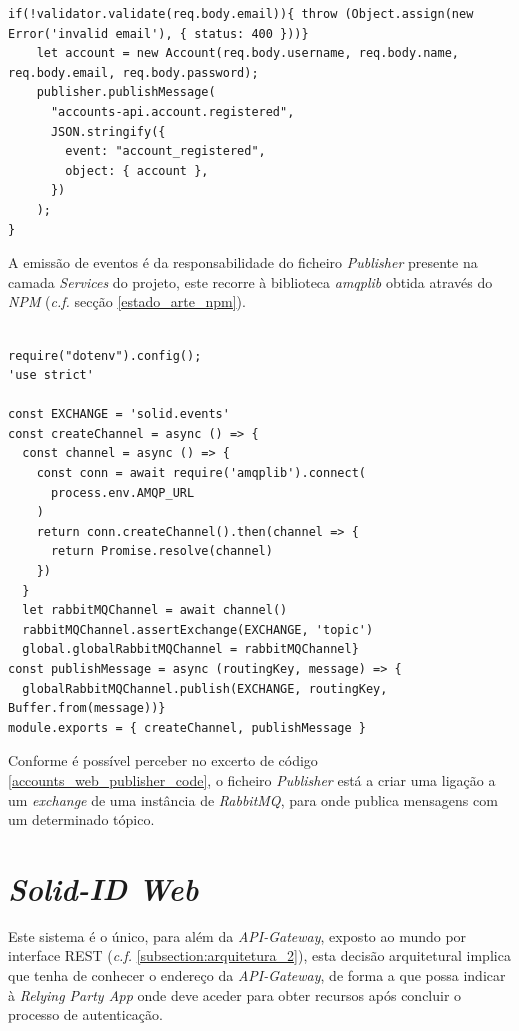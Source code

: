 \begin{lstlisting}[caption={\emph{AccountController} responsável por validar e propagar informação do utilizador}, label={accounts_web_account_controller}]
if(!validator.validate(req.body.email)){ throw (Object.assign(new Error('invalid email'), { status: 400 }))}
    let account = new Account(req.body.username, req.body.name, req.body.email, req.body.password);
    publisher.publishMessage(
      "accounts-api.account.registered",
      JSON.stringify({
        event: "account_registered",
        object: { account },
      })
    );
}
\end{lstlisting}

A emissão de eventos é da responsabilidade do ficheiro \emph{Publisher} presente na camada \emph{Services} do projeto, este recorre à biblioteca \emph{amqplib} obtida através do \emph{NPM} (\emph{c.f.} secção \ref{estado_arte_npm}).

\begin{lstlisting}[caption={\emph{Publisher} responsável por emitir os eventos para o \emph{RabbitMQ}}, label={accounts_web_publisher_code}]

require("dotenv").config();
'use strict'

const EXCHANGE = 'solid.events'
const createChannel = async () => {
  const channel = async () => {
    const conn = await require('amqplib').connect(
      process.env.AMQP_URL
    )
    return conn.createChannel().then(channel => {
      return Promise.resolve(channel)
    })
  }
  let rabbitMQChannel = await channel()
  rabbitMQChannel.assertExchange(EXCHANGE, 'topic')
  global.globalRabbitMQChannel = rabbitMQChannel}
const publishMessage = async (routingKey, message) => {
  globalRabbitMQChannel.publish(EXCHANGE, routingKey, Buffer.from(message))}
module.exports = { createChannel, publishMessage }
\end{lstlisting}

Conforme é possível perceber no excerto de código \ref{accounts_web_publisher_code}, o ficheiro \emph{Publisher} está a criar uma ligação a um \emph{exchange} de uma instância de \emph{RabbitMQ}, para onde publica mensagens com um determinado tópico.

\section{\emph{Solid-ID Web}}
Este sistema é o único, para além da \emph{API-Gateway}, exposto ao mundo por interface REST (\emph{c.f.} \ref{subsection:arquitetura_2}), esta decisão arquitetural implica que tenha de conhecer o endereço da \emph{API-Gateway}, de forma a que possa indicar à \emph{Relying Party App} onde deve aceder para obter recursos após concluir o processo de autenticação.

